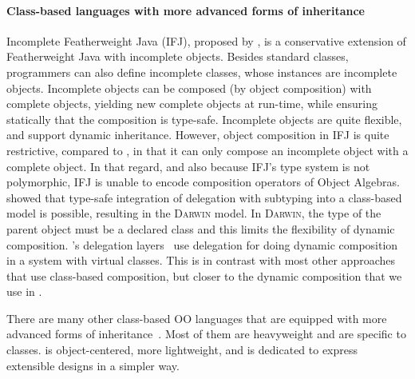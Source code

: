 \paragraph{Class-based languages with more advanced forms of inheritance}

Incomplete Featherweight Java (IFJ), proposed by \citet{bettini2008type}, is a
conservative extension of Featherweight Java with incomplete objects. Besides
standard classes, programmers can also define incomplete classes, whose
instances are incomplete objects. Incomplete objects can be composed (by object
composition) with complete objects, yielding new complete objects at run-time,
while ensuring statically that the composition is type-safe. Incomplete objects
are quite flexible, and support dynamic inheritance. However, object composition
in IFJ is quite restrictive, compared to \name, in that it can only compose an
incomplete object with a complete object. In that regard, and also because IFJ's
type system is not polymorphic, IFJ is unable to encode composition operators of
Object Algebras. \citet{kniesel1999type} showed that type-safe integration of
delegation with subtyping into a class-based model is possible, resulting in the
\textsc{Darwin} model. In \textsc{Darwin}, the type of the parent object must be
a declared class and this limits the flexibility of dynamic composition.
\citeauthor{ostermann2002dynamically}'s delegation
layers~\citep{ostermann2002dynamically} use delegation for doing dynamic
composition in a system with virtual classes. This is in contrast with most
other approaches that use class-based composition, but closer to the dynamic
composition that we use in \name.

There are many other class-based OO languages that are equipped with more
advanced forms of
inheritance~\cite{meyer1987eiffel,buchi2000generic,ostermann2001object}. Most of
them are heavyweight and are specific to classes. \name is object-centered, more
lightweight, and is dedicated to express extensible designs in a simpler way.



